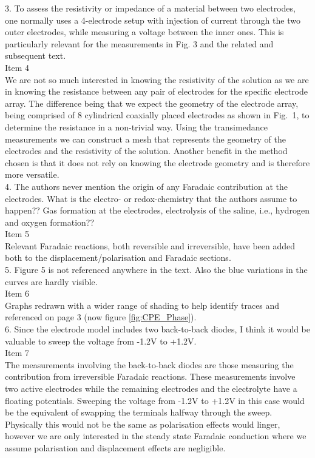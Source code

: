 \documentclass[journal, a4paper]{IEEEtran}
\begin{document}
{3. To assess the resistivity or impedance of a material between two electrodes, one normally uses a 4-electrode setup with injection of current through the two outer electrodes, while measuring a voltage between the inner ones. This is particularly relevant for the measurements in Fig. 3 and the related and subsequent text.\\
{\color{OliveGreen} 
    Item 4\\
    We are not so much interested in knowing the resistivity of the solution as we are in knowing the resistance between any pair of electrodes for the specific electrode array. The difference being that we expect the geometry of the electrode array, being comprised of 8 cylindrical coaxially placed electrodes as shown in Fig.~1, to determine the resistance in a non-trivial way. Using the transimedance measurements we can construct a mesh that represents the geometry of the electrodes and the resistivity of the solution. Another benefit in the method chosen is that it does not rely on knowing the electrode geometry and is therefore more versatile.
}\\

4. The authors never mention the origin of any Faradaic contribution at the electrodes. What is the electro- or redox-chemistry that the authors assume to happen?? Gas formation at the electrodes, electrolysis of the saline, i.e., hydrogen and oxygen formation??\\
{\color{OliveGreen}
    Item 5\\
    Relevant Faradaic reactions, both reversible and irreversible, have been added both to the displacement/polarisation and Faradaic sections.
}\\

5. Figure 5 is not referenced anywhere in the text. Also the blue variations in the curves are hardly visible.\\
{\color{OliveGreen} 
    Item 6\\
    Graphs redrawn with a wider range of shading to help identify traces and referenced on page 3 (now figure \ref{fig:CPE_Phase}).
}\\

6. Since the electrode model includes two back-to-back diodes, I think it would be valuable to sweep the voltage from -1.2V to +1.2V.\\
{\color{OliveGreen}
    Item 7\\
    The measurements involving the back-to-back diodes are those measuring the contribution from irreversible Faradaic reactions. These measurements involve two active electrodes while the remaining electrodes and the electrolyte have a floating potentials. Sweeping the voltage from -1.2V to +1.2V in this case would be the equivalent of swapping the terminals halfway through the sweep. Physically this would not be the same as polarisation effects would linger, however we are only interested in the steady state Faradaic conduction where we assume polarisation and displacement effects are negligible.
}\\

}
\end{document}
